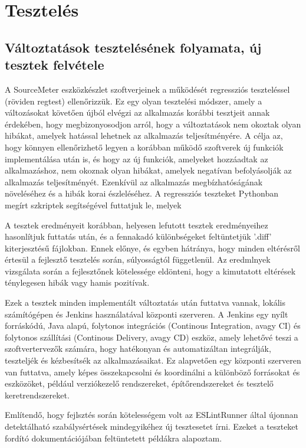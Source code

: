 \chapter{Tesztelés}
\label{chap:fejezet5}

\section{Változtatások tesztelésének folyamata, új tesztek felvétele}

A SourceMeter eszközkészlet szoftverjeinek a működését regressziós teszteléssel (röviden regtest) ellenőrizzük. Ez egy olyan tesztelési módszer, amely a változásokat követően újból elvégzi az alkalmazás korábbi tesztjeit annak érdekében, hogy megbizonyosodjon arról, hogy a változtatások nem okoztak olyan hibákat, amelyek hatással lehetnek az alkalmazás teljesítményére.
A célja az, hogy könnyen ellenőrizhető legyen a korábban működő szoftverek új funkciók implementálása után is, és hogy az új funkciók, amelyeket hozzáadtak az alkalmazáshoz, nem okoznak olyan hibákat, amelyek negatívan befolyásolják az alkalmazás teljesítményét. Ezenkívül az alkalmazás megbízhatóságának növeléséhez és a hibák korai észleléséhez.
A regressziós teszteket Pythonban megírt szkriptek segítségével futtatjuk le, melyek 

A tesztek eredményeit korábban, helyesen lefutott tesztek eredményeihez hasonlítjuk futtatás után, és a fennakadó különbségeket feltüntetjük '.diff' kiterjesztésű fájlokban. Ennek előnye, és egyben hátránya, hogy minden eltérésről értesül a fejlesztő tesztelés során, súlyosságtól függetlenül. Az eredmlnyek vizsgálata során a fejlesztőnek kötelessége eldönteni, hogy a kimutatott eltérések ténylegesen hibák vagy hamis pozitívak.

Ezek a tesztek minden implementált változtatás után futtatva vannak, lokális számítógépen és Jenkins használatával központi szerveren. 
A Jenkins egy nyílt forráskódú, Java alapú, folytonos integrációs (Continous Integration, avagy CI) és folytonos szállítási (Continous Delivery, avagy CD) eszköz, amely lehetővé teszi a szoftvertervezők számára, hogy hatékonyan és automatizáltan integrálják, teszteljék és kézbesítsék az alkalmazásaikat. Ez alapvetően egy központi szerveren van futtatva, amely képes összekapcsolni és koordinálni a különböző forrásokat és eszközöket, például verziókezelő rendszereket, építőrendszereket és tesztelő keretrendszereket.

Említendő, hogy fejlsztés során kötelességem volt az ESLintRunner által újonnan detektálható szabálysértések mindegyikéhez új tesztesetet írni. Ezeket a teszteket fordító dokumentációjában feltüntetett példákra alapoztam.

